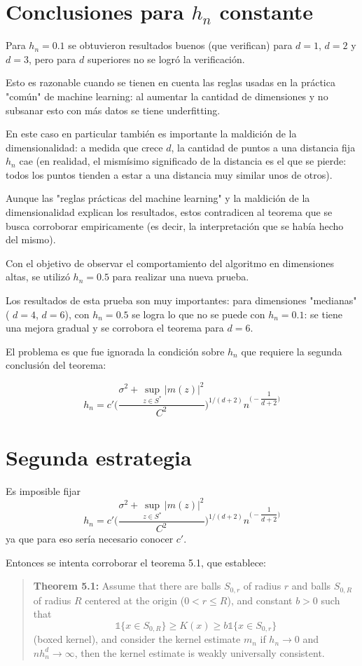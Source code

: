 \documentclass[12pt, a4paper]{article}
\begin{document}
\section{Conclusiones para $h_n$ constante}
Para $h_n=0.1$ se obtuvieron resultados buenos (que verifican) para $d=1$, $d=2$ y $d=3$, pero para $d$ superiores no se logró la verificación. 

Esto es razonable cuando se tienen en cuenta las reglas usadas en la práctica "común" de machine learning: al aumentar la cantidad de dimensiones y no subsanar esto con más datos se tiene underfitting. 

En este caso en particular también es importante la maldición de la dimensionalidad: a medida que crece $d$, la cantidad de puntos a una distancia fija $h_n$ cae (en realidad, el mismísimo significado de la distancia es el que se pierde: todos los puntos tienden a estar a una distancia muy similar unos de otros).

Aunque las "reglas prácticas del machine learning" y la maldición de la dimensionalidad explican los resultados, estos contradicen al teorema que se busca corroborar empiricamente (es decir, la interpretación que se había hecho del mismo).

Con el objetivo de observar el comportamiento del algoritmo en dimensiones altas, se utilizó $h_n=0.5$ para realizar una nueva prueba.

Los resultados de esta prueba son muy importantes: para dimensiones "medianas"  ( $d=4$, $d=6$), con $h_n=0.5$ se logra lo que no se puede con $h_n=0.1$: se tiene una mejora gradual y se corrobora el teorema para $d=6$.

El problema es que fue ignorada la condición sobre $h_n$ que requiere la segunda conclusión del teorema:


$$
h_n = c' \Bigg( \dfrac{\sigma^2 + \mathop{sup}_{z\in S^{*}}|m(z)|^2 }{C^2} \Bigg)^{1/(d+2)} n^{\Big (-\dfrac{1}{d+2}\Big )}
$$

\section{Segunda estrategia}

Es imposible fijar 
$$
h_n = c' \Bigg( \dfrac{\sigma^2 + \mathop{sup}_{z\in S^{*}}|m(z)|^2 }{C^2} \Bigg)^{1/(d+2)} n^{\Big (-\dfrac{1}{d+2}\Big )}
$$
ya que para eso sería necesario conocer $c'$.

Entonces se intenta corroborar el teorema 5.1, que establece:

\begin{quotation}
\textbf{Theorem 5.1:} Assume that there are balls $S_{0,r}$ of radius $r$ and balls $S_{0,R}$
of radius $R$ centered at the origin ($0 < r\leq R$), and constant $b>0$ such that
$$
\mathds{1}\{x\in S_{0,R}\}\geq K(x) \geq b \mathds{1}\{x\in S_{0,r}\}
$$
(boxed kernel), and consider the kernel estimate $m_n$ if $h_n \rightarrow 0$ and $n h_n^d \rightarrow \infty$, then the kernel estimate is weakly universally consistent.
\end{quotation}
\end{document}
